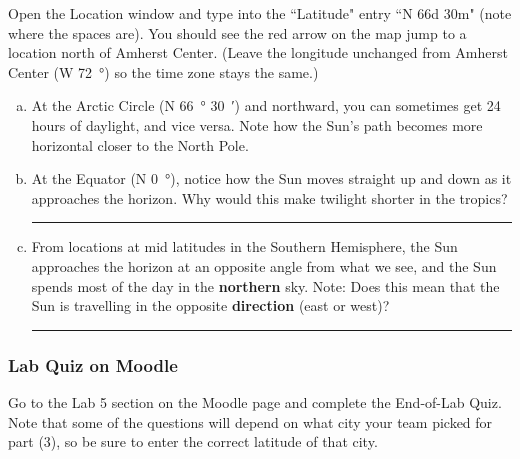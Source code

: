 \documentclass[main.tex]{subfiles}
\begin{document}
Open the Location window and type into the ``Latitude" entry ``N 66d 30m" (note where the spaces are). You should see the red arrow on the map jump to a location north of Amherst Center. (Leave the longitude unchanged from Amherst Center (W \SI{72}{\degree}) so the time zone stays the same.)
\begin{enumerate} [a.]
\item At the Arctic Circle (N \SI{66}{\degree} \SI{30}{\arcminute}) and northward, you can sometimes get 24 hours of daylight, and vice versa. Note how the Sun's path becomes more horizontal closer to the North Pole.

\item At the Equator (N \SI{0}{\degree}), notice how the Sun moves straight up and down as it approaches the horizon. Why would this make twilight shorter in the tropics?\\

\rule{15cm}{.2mm}


\item From locations at mid latitudes in the Southern Hemisphere, the Sun approaches the horizon at an opposite angle from what we see, and the Sun spends most of the day in the \textbf{northern} sky. Note: Does this mean that the Sun is travelling in the opposite \textbf{direction} (east or west)?\\

\rule{15cm}{.2mm}

\end{enumerate}

\subsubsection{Lab Quiz on Moodle}
Go to the Lab 5 section on the Moodle page and complete the End-of-Lab Quiz. Note that some of the questions will depend on what city your team picked for part (3), so be sure to enter the correct latitude of that city.

\end{document}

